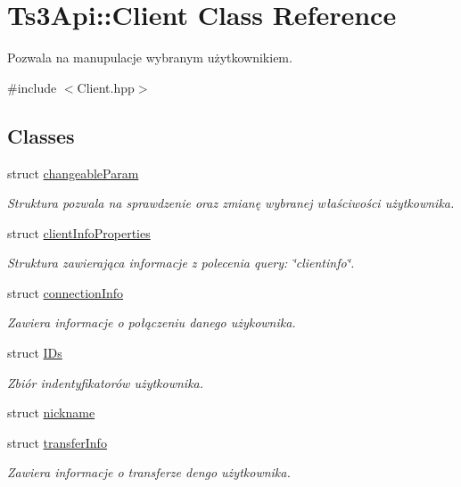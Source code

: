 \hypertarget{class_ts3_api_1_1_client}{}\section{Ts3\+Api\+:\+:Client Class Reference}
\label{class_ts3_api_1_1_client}


Pozwala na manupulacje wybranym użytkownikiem.  




{\ttfamily \#include $<$Client.\+hpp$>$}

\subsection*{Classes}
\begin{DoxyCompactItemize}
\item 
struct \hyperlink{struct_ts3_api_1_1_client_1_1changeable_param}{changeable\+Param}
\begin{DoxyCompactList}\small\item\em Struktura pozwala na sprawdzenie oraz zmianę wybranej właściwości użytkownika. \end{DoxyCompactList}\item 
struct \hyperlink{struct_ts3_api_1_1_client_1_1client_info_properties}{client\+Info\+Properties}
\begin{DoxyCompactList}\small\item\em Struktura zawierająca informacje z polecenia query\+: \char`\"{}clientinfo\char`\"{}. \end{DoxyCompactList}\item 
struct \hyperlink{struct_ts3_api_1_1_client_1_1connection_info}{connection\+Info}
\begin{DoxyCompactList}\small\item\em Zawiera informacje o połączeniu danego użykownika. \end{DoxyCompactList}\item 
struct \hyperlink{struct_ts3_api_1_1_client_1_1_i_ds}{I\+Ds}
\begin{DoxyCompactList}\small\item\em Zbiór indentyfikatorów użytkownika. \end{DoxyCompactList}\item 
struct \hyperlink{struct_ts3_api_1_1_client_1_1nickname}{nickname}
\item 
struct \hyperlink{struct_ts3_api_1_1_client_1_1transfer_info}{transfer\+Info}
\begin{DoxyCompactList}\small\item\em Zawiera informacje o transferze dengo użytkownika. \end{DoxyCompactList}\end{DoxyCompactItemize}
